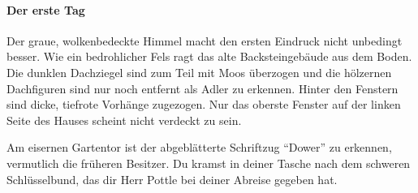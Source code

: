 \paragraph{Der erste Tag}

Der graue, wolkenbedeckte Himmel macht den ersten Eindruck nicht unbedingt besser.
Wie ein bedrohlicher Fels ragt das alte Backsteingebäude aus dem Boden.
Die dunklen Dachziegel sind zum Teil mit Moos überzogen und die hölzernen Dachfiguren sind nur noch entfernt als Adler zu erkennen.
Hinter den Fenstern sind dicke, tiefrote Vorhänge zugezogen.
Nur das oberste Fenster auf der linken Seite des Hauses scheint nicht verdeckt zu sein.

Am eisernen Gartentor ist der abgeblätterte Schriftzug ``Dower'' zu erkennen, vermutlich die früheren Besitzer.
Du kramst in deiner Tasche nach dem schweren Schlüsselbund, das dir Herr Pottle bei deiner Abreise gegeben hat.
